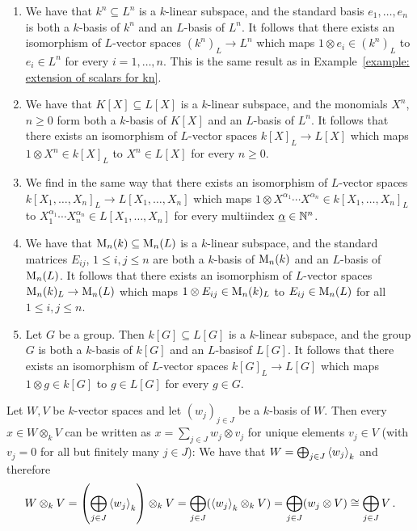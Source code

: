 \begin{example}
  \label{example: recognizing extension of scalar}
  \leavevmode
  \begin{enumerate}
    \item
      We have that $k^n \subseteq L^n$ is a $k$-linear subspace, and the standard basis $e_1, \dotsc, e_n$ is both a $k$-basis of $k^n$ and an $L$-basis of $L^n$.
      It follows that there exists an isomorphism of $L$-vector spaces $(k^n)_L \to L^n$ which maps $1 \otimes e_i \in (k^n)_L$ to $e_i \in L^n$ for every $i = 1, \dotsc, n$.
      This is the same result as in Example~\ref{example: extension of scalars for kn}.
    \item
      We have that $K[X] \subseteq L[X]$ is a $k$-linear subspace, and the monomials $X^n$, $n \geq 0$ form both a $k$-basis of $K[X]$ and an $L$-basis of $L^n$.
      It follows that there exists an isomorphism of $L$-vector spaces $k[X]_L \to L[X]$ which maps $1 \otimes X^n \in k[X]_L$ to $X^n \in L[X]$ for every $n \geq 0$.
    \item
      We find in the same way that there exists an isomorphism of $L$-vector spaces $k[X_1, \dotsc, X_n]_L \to L[X_1, \dotsc, X_n]$ which maps $1 \otimes X^{\alpha_1} \dotsm X^{\alpha_n} \in k[X_1, \dotsc, X_n]_L$ to $X_1^{\alpha_1} \dotsm X_n^{\alpha_n} \in L[X_1, \dotsc, X_n]$ for every multiindex $\underline{\alpha} \in \mathbb{N}^n$.
    \item
      We have that $\operatorname{M}_n(k) \subseteq \operatorname{M}_n(L)$ is a $k$-linear subspace, and the standard matrices $E_{ij}$, $1 \leq i,j \leq n$ are both a $k$-basis of $\operatorname{M}_n(k)$ and an $L$-basis of $\operatorname{M}_n(L)$.
      It follows that there exists an isomorphism of $L$-vector spaces $\operatorname{M}_n(k)_L \to \operatorname{M}_n(L)$ which maps $1 \otimes E_{ij} \in \operatorname{M}_n(k)_L$ to $E_{ij} \in \operatorname{M}_n(L)$ for all $1 \leq i,j \leq n$.
    \item
      Let $G$ be a group.
      Then $k[G] \subseteq L[G]$ is a $k$-linear subspace, and the group $G$ is both a $k$-basis of $k[G]$ and an $L$-basisof $L[G]$.
      It follows that there exists an isomorphism of $L$-vector spaces $k[G]_L \to L[G]$ which maps $1 \otimes g \in k[G]$ to $g \in L[G]$ for every $g \in G$.
  \end{enumerate}
\end{example}


\begin{recall}
  Let $W, V$ be $k$-vector spaces and let $(w_j)_{j \in J}$ be a $k$-basis of $W$.
  Then every $x \in W \otimes_k V$ can be written as $x = \sum_{j \in J} w_j \otimes v_j$ for unique elements $v_j \in V$ (with $v_j = 0$ for all but finitely many $j \in J$):
  We have that $W = \bigoplus_{j \in J} \left\langle w_j \right\rangle_k$ and therefore
  \[
          W \otimes_k V
    =     \left( \bigoplus_{j \in J} \left\langle w_j \right\rangle_k \right) \otimes_k V
    =     \bigoplus_{j \in J} ( \left\langle w_j \right\rangle_k \otimes_k V )
    =     \bigoplus_{j \in J} (w_j \otimes V)
    \cong \bigoplus_{j \in J} V \,.
  \]
\end{recall}


